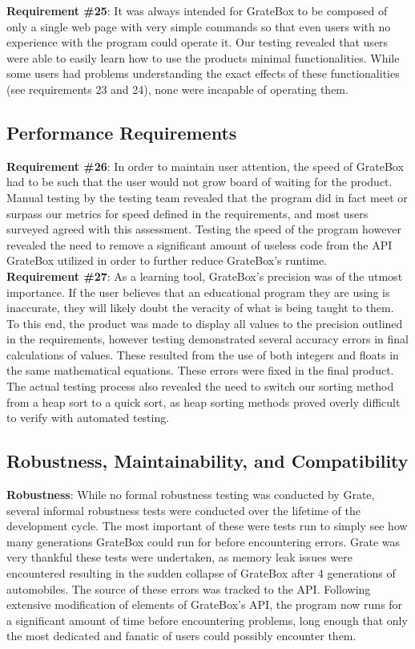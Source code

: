 \documentclass[12pt, titlepage]{article}
\begin{document}
\textbf{Requirement \#25}: It was always intended for GrateBox to be composed of 
only a single web page with very simple commands so that even users with no 
experience with the program could operate it. Our testing revealed that users 
were able to easily learn how to use the products minimal functionalities. While 
some users had problems understanding the exact effects of these functionalities 
(see requirements 23 and 24), none were incapable of operating them.

\subsection{Performance Requirements}

\textbf{Requirement \#26}: In order to maintain user attention, the speed of 
GrateBox had to be such that the user would not grow board of waiting for the 
product. Manual testing by the testing team revealed that the program did in 
fact meet or surpass our metrics for speed defined in the requirements, and most 
users surveyed agreed with this assessment. Testing the speed of the program 
however revealed the need to remove a significant amount of useless code from 
the API GrateBox utilized in order to further reduce GrateBox's runtime.\\

\textbf{Requirement \#27}: As a learning tool, GrateBox's precision was of the 
utmost importance. If the user believes that an educational program they are 
using is inaccurate, they will likely doubt the veracity of what is being taught 
to them. To this end, the product was made to display all values to the 
precision outlined in the requirements, however testing demonstrated several 
accuracy errors in final calculations of values. These resulted from the use of 
both integers and floats in the same mathematical equations. These errors were 
fixed in the final product. The actual testing process also revealed the need to 
switch our sorting method from a heap sort to a quick sort, as heap sorting 
methods proved overly difficult to verify with automated testing.

\subsection{Robustness, Maintainability, and Compatibility}

\textbf{Robustness}: While no formal robustness testing was conducted by Grate, 
several informal robustness tests were conducted over the lifetime of the 
development cycle. The most important of these were tests run to simply see how 
many generations GrateBox could run for before encountering errors. Grate was 
very thankful these tests were undertaken, as memory leak issues were 
encountered resulting in the sudden collapse of GrateBox after 4 generations of 
automobiles. The source of these errors was tracked to the API. Following 
extensive modification of elements of GrateBox's API, the program now runs for a 
significant amount of time before encountering problems, long enough that only 
the most dedicated and fanatic of users could possibly encounter them.\\
\end{document}
